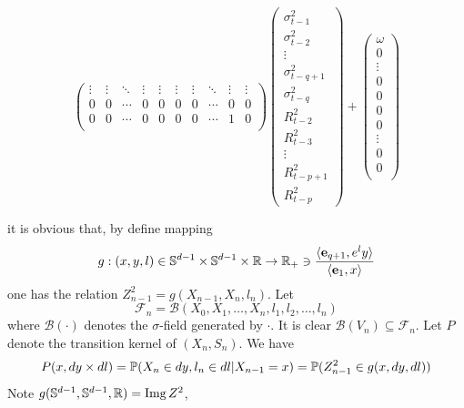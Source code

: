 \begin{tiny}
\begin{equation*}
\begin{pmatrix}
        \vdots & \vdots & \ddots &
        \vdots & \vdots & \vdots & \vdots &
        \ddots & \vdots & \vdots \\
        0 & 0 & \cdots &
        0 & 0 & 0 & 0 & \cdots & 0 & 0 \\    
        0 & 0 & \cdots &
        0 & 0 & 0 & 0 & \cdots & 1 & 0 \\    
      \end{pmatrix}
      \begin{pmatrix}
        \sigma_{t-1}^2 \\
        \sigma_{t-2}^2 \\
        \vdots \\
        \sigma_{t-q+1}^2 \\
        \sigma_{t-q}^2 \\
        R_{t-2}^2 \\
        R_{t-3}^2 \\
        \vdots \\
        R_{t-p+1}^2 \\
        R_{t-p}^2
      \end{pmatrix}
      +
      \begin{pmatrix}
        \omega \\
        0 \\
        \vdots \\
        0 \\
        0 \\
        0 \\
        0 \\
        \vdots \\
        0 \\
        0 \\
      \end{pmatrix}
  \end{equation*}
\end{tiny}
it is obvious that, by define mapping
\[
g: (x, y, l) \in \sphere^{d-1} \times \sphere^{d-1} \times \reals
\to
\reals_+ \ni {
  \inn{\vec e_{q+1}, e^l y}
  \over
  \inn{\vec e_{1}, x}
}
\]
one has the relation $Z_{n-1}^2 = g(X_{n-1}, X_n, l_n)$. Let
\[
\mathscr F_n = \mathcal B(X_0, X_1, \dots, X_n, l_1, l_2, \dots, l_n)
\]
where $\mathcal B(\cdot)$ denotes the $\sigma$-field generated by
$\cdot$. It is clear $\mathcal B(V_n) \subseteq \mathscr F_n$.
Let $P$ denote the transition kernel of $(X_n, S_n)$. We have
\[
  P(x, dy \times dl) = \P(X_n \in dy, l_n \in dl | X_{n-1} = x)
  = \P(Z_{n-1}^2 \in g(x, dy, dl))
  \]
Note $g(\sphere^{d-1}, \sphere^{d-1}, \reals) = \img Z^2$,
